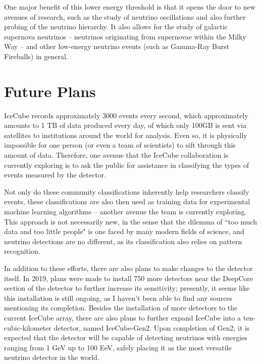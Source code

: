 \documentclass[11pt]{article}
\begin{document}
    One major benefit of this lower energy threshold is that it opens the door to new avenues
    of research, such as the study of neutrino oscillations and also further probing of the 
    neutrino hierarchy. It also allows for the study of galactic supernova neutrinos -- 
    neutrinos originating from supernovae within the Milky Way -- and other low-energy neutrino
    events (such as Gamma-Ray Burst Fireballs) in general.

    \section{Future Plans}
    IceCube records approximately 3000 events every second, 
    which approximately amounts to 1 TB of data produced every day, of which only 
    100GB is sent via satellites to institutions around the world for analysis. Even so, 
    it is physically impossible for one person (or even a team of scientists) to sift through
    this amount of data. Therefore, one avenue that the IceCube collaboration is currently 
    exploring is to ask the public for assistance in classifying the types of events 
    measured by the detector. 

    Not only do these community classifications inherently help researchers classify 
    events, these classifications are also then used as training data for experimental 
    machine learning algorithms -- another avenue the team is currently exploring. 
    This approach is not necessarily new, in the sense that the dilemma of ``too much 
    data and too little people" is one faced by many modern fields of science, and 
    neutrino detections are no different, as its classification also relies on pattern 
    recognition. 

    In addition to these efforts, there are also plans to make changes to the detector 
    itself. In 2019, plans were made to install 750 more detectors near the DeepCore 
    section of the detector to further increase its sensitivity; presently, 
    it seems like this installation is still ongoing, as I haven't been able to 
    find any sources mentioning its completion. Besides the installation of 
    more detectors to the current IceCube array, there are also plans to further expand
    IceCube into a ten-cubic-kilometer detector, named IceCube-Gen2. Upon completion of 
    Gen2, it is expected that the detector will be capable of detecting neutrinos with 
    energies ranging from 1 GeV up to 100 EeV, safely placing it as the most versatile
    neutrino detector in the world.

    \nocite{*}
    \printbibliography
    
\end{document}
